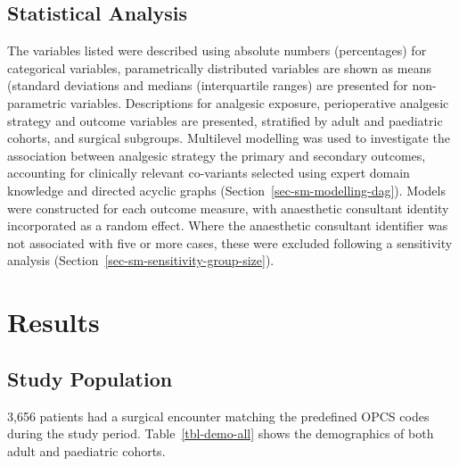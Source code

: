 \documentclass[
  letterpaper,
  DIV=11,
  numbers=noendperiod]{scrreprt}
\begin{document}
\subsection{Statistical Analysis}\label{statistical-analysis}

The variables listed were described using absolute numbers (percentages)
for categorical variables, parametrically distributed variables are
shown as means (standard deviations and medians (interquartile ranges)
are presented for non-parametric variables. Descriptions for analgesic
exposure, perioperative analgesic strategy and outcome variables are
presented, stratified by adult and paediatric cohorts, and surgical
subgroups. Multilevel modelling was used to investigate the association
between analgesic strategy the primary and secondary outcomes,
accounting for clinically relevant co-variants selected using expert
domain knowledge and directed acyclic graphs
(Section~\ref{sec-sm-modelling-dag}). Models were constructed for each
outcome measure, with anaesthetic consultant identity incorporated as a
random effect. Where the anaesthetic consultant identifier was not
associated with five or more cases, these were excluded following a
sensitivity analysis (Section~\ref{sec-sm-sensitivity-group-size}).

\section{Results}\label{results-1}

\subsection{Study Population}\label{study-population}

3,656 patients had a surgical encounter matching the predefined OPCS
codes during the study period. Table~\ref{tbl-demo-all} shows the
demographics of both adult and paediatric cohorts.
\end{document}
